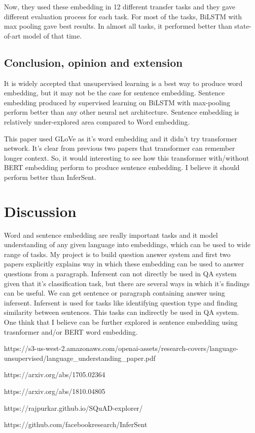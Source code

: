 \documentclass[11pt,a4paper]{article}
\begin{document}
Now, they used these embedding in 12 different transfer tasks and they gave different evaluation process for each task. For most of the tasks, BiLSTM with max pooling gave best results. In almost all tasks, it performed better than state-of-art model of that time.


\subsection{Conclusion, opinion and extension}
It is widely accepted that unsupervised learning is a best way to produce word embedding, but it may not be the case for sentence embedding. Sentence embedding produced by supervised learning on BiLSTM with max-pooling perform better than any other neural net architecture. Sentence embedding is relatively under-explored area compared to Word embedding. 

This paper used GLoVe as it's word embedding and it didn't try transformer network. It's clear from previous two papers that transformer can remember longer context. So, it would interesting to see how this transformer with/without BERT embedding perform to produce sentence embedding. I believe it should perform better than InferSent.


\section{Discussion}

Word and sentence embedding are really important tasks and it model understanding of any given language into embeddings, which can be used to wide range of tasks. My project is to build question answer system and first two papers explicitly explains way in which these embedding can be used to answer questions from a paragraph. Infersent can not directly be used in QA system given that it's classification task, but there are several ways in which it's findings can be useful. We can get sentence or paragraph containing answer using infersent. Infersent is used for tasks like identifying question type and finding similarity between sentences. This tasks can indirectly be used in QA system. One think that I believe can be further explored is sentence embedding using trasnformer and/or BERT word embedding. 

\vspace{2}

\begin{thebibliography}{5}
https://s3-us-west-2.amazonaws.com/openai-assets/research-covers/language-unsupervised/language\_understanding\_paper.pdf

https://arxiv.org/abs/1705.02364

https://arxiv.org/abs/1810.04805

https://rajpurkar.github.io/SQuAD-explorer/

https://github.com/facebookresearch/InferSent

\end{thebibliography}
\end{document}

